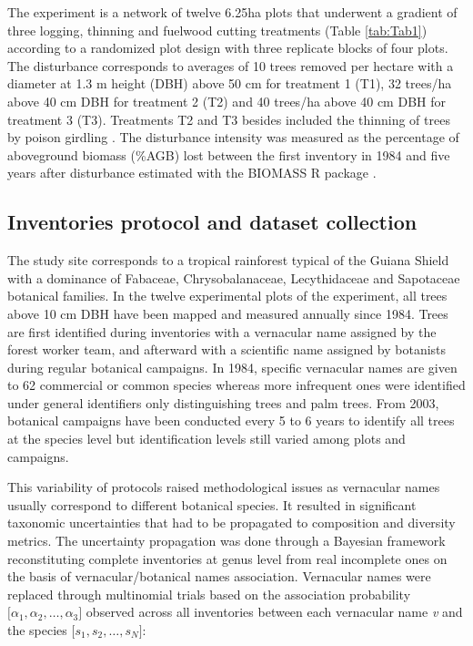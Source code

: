 \documentclass[fleqn,10pt]{ArtEcoFoG} %
\theoremstyle{definition}
\theoremstyle{definition}
\theoremstyle{definition}
\theoremstyle{remark}
\begin{document}
The experiment is a network of twelve 6.25ha plots that underwent a
gradient of three logging, thinning and fuelwood cutting treatments
(Table \ref{tab:Tab1}) according to a randomized plot design with three
replicate blocks of four plots. The disturbance corresponds to averages
of 10 trees removed per hectare with a diameter at 1.3 m height (DBH)
above 50 cm for treatment 1 (T1), 32 trees/ha above 40 cm DBH for
treatment 2 (T2) and 40 trees/ha above 40 cm DBH for treatment 3 (T3).
Treatments T2 and T3 besides included the thinning of trees by poison
girdling \citep{Schmitt1990, Blanc2009}. The disturbance intensity was
measured as the percentage of aboveground biomass (\%AGB) lost between
the first inventory in 1984 and five years after disturbance
\citep{Piponiot2016} estimated with the BIOMASS R package
\citep{Biomass2018}.

\subsection{Inventories protocol and dataset
collection}\label{inventories-protocol-and-dataset-collection}

The study site corresponds to a tropical rainforest typical of the
Guiana Shield with a dominance of Fabaceae, Chrysobalanaceae,
Lecythidaceae and Sapotaceae botanical families. In the twelve
experimental plots of the experiment, all trees above 10 cm DBH have
been mapped and measured annually since 1984. Trees are first identified
during inventories with a vernacular name assigned by the forest worker
team, and afterward with a scientific name assigned by botanists during
regular botanical campaigns. In 1984, specific vernacular names are
given to 62 commercial or common species whereas more infrequent ones
were identified under general identifiers only distinguishing trees and
palm trees. From 2003, botanical campaigns have been conducted every 5
to 6 years to identify all trees at the species level but identification
levels still varied among plots and campaigns.

This variability of protocols raised methodological issues as vernacular
names usually correspond to different botanical species. It resulted in
significant taxonomic uncertainties that had to be propagated to
composition and diversity metrics. The uncertainty propagation was done
through a Bayesian framework reconstituting complete inventories at
genus level from real incomplete ones on the basis of
vernacular/botanical names association. Vernacular names were replaced
through multinomial trials based on the association probability
\(\big[\alpha_1, \alpha_2,…, \alpha_3\big]\) observed across all
inventories between each vernacular name \emph{v} and the species
\(\big[s_1, s_2, …, s_N\big]\):
\end{document}
